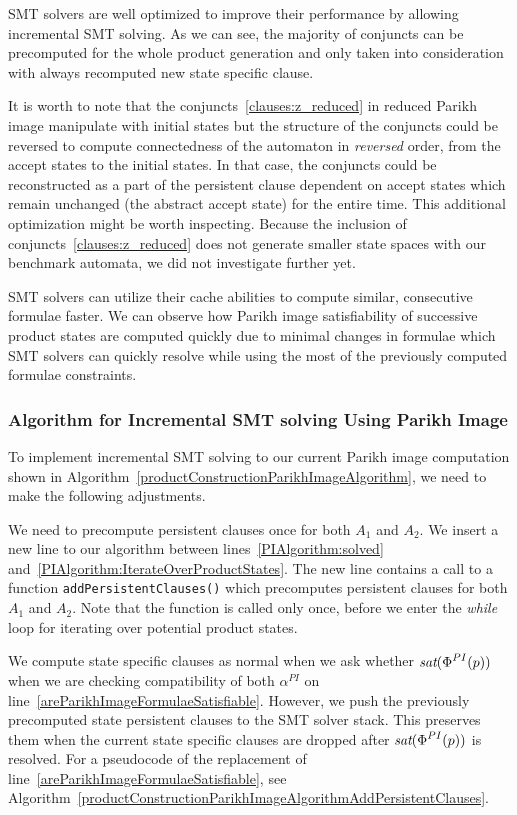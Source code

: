 SMT solvers are well optimized to improve their performance by allowing incremental SMT solving. As we can see, the majority of conjuncts can be precomputed for the whole product generation and only taken into consideration with always recomputed new state specific clause.

It is worth to note that the conjuncts~\ref{clauses:z_reduced} in reduced Parikh image manipulate with initial states but the structure of the conjuncts could be reversed to compute connectedness of the automaton in \emph{reversed} order, from the accept states to the initial states. In that case, the conjuncts could be reconstructed as a part of the persistent clause dependent on accept states which remain unchanged (the abstract accept state) for the entire time. This additional optimization might be worth inspecting. Because the inclusion of conjuncts~\ref{clauses:z_reduced} does not generate smaller state spaces with our benchmark automata, we did not investigate further yet.

SMT solvers can utilize their cache abilities to compute similar, consecutive formulae faster. We can observe how Parikh image satisfiability of successive product states are computed quickly due to minimal changes in formulae which SMT solvers can quickly resolve while using the most of the previously computed formulae constraints.

\subsubsection{Algorithm for Incremental SMT solving Using Parikh Image}


To implement incremental SMT solving to our current Parikh image computation shown in Algorithm~\ref{productConstructionParikhImageAlgorithm}, we need to make the following adjustments.

We need to precompute persistent clauses once for both $A_1$ and $A_2$. We insert a new line to our algorithm between lines~\ref{PIAlgorithm:solved} and~\ref{PIAlgorithm:IterateOverProductStates}. The new line contains a call to a function \texttt{addPersistentClauses()} which precomputes persistent clauses for both $A_1$ and $A_2$. Note that the function is called only once, before we enter the \emph{while} loop for iterating over potential product states.

We compute state specific clauses as normal when we ask whether $\emph{sat}(\emph{$\Phi$}^{PI}(p))$ when we are checking compatibility of both $\alpha^{PI}$ on line~\ref{areParikhImageFormulaeSatisfiable}. However, we push the previously precomputed state persistent clauses to the SMT solver stack. This preserves them when the current state specific clauses are dropped after $\emph{sat}(\emph{$\Phi$}^{PI}(p))$ is resolved. For a pseudocode of the replacement of line~\ref{areParikhImageFormulaeSatisfiable}, see Algorithm~\ref{productConstructionParikhImageAlgorithmAddPersistentClauses}.

